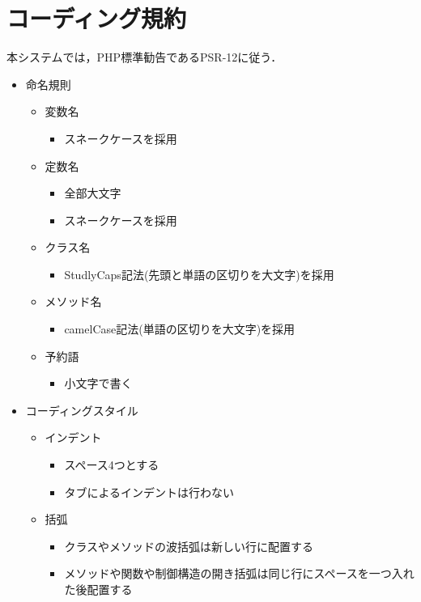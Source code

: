 \documentclass[a4paper, titlepage]{jsarticle}
\begin{document}
\section{コーディング規約}
本システムでは，PHP標準勧告であるPSR-12\cite{PSR}に従う．
\begin{itemize}
  \item 命名規則
  \begin{itemize}
    \item 変数名
    \begin{itemize}
      \item スネークケースを採用
    \end{itemize}
    \item 定数名
    \begin{itemize}
      \item 全部大文字
      \item スネークケースを採用
    \end{itemize}
    \item クラス名
    \begin{itemize}
      \item StudlyCaps記法(先頭と単語の区切りを大文字)を採用
    \end{itemize}
    \item メソッド名
    \begin{itemize}
      \item camelCase記法(単語の区切りを大文字)を採用
    \end{itemize}
    \item 予約語
    \begin{itemize}
      \item 小文字で書く
    \end{itemize}
  \end{itemize}
  \item コーディングスタイル
  \begin{itemize}
    \item インデント
    \begin{itemize}
      \item スペース4つとする
      \item タブによるインデントは行わない
    \end{itemize}
    \item 括弧
    \begin{itemize}
      \item クラスやメソッドの波括弧は新しい行に配置する
      \item メソッドや関数や制御構造の開き括弧は同じ行にスペースを一つ入れた後配置する

\end{itemize}
\end{itemize}
\end{itemize}
\end{document}
